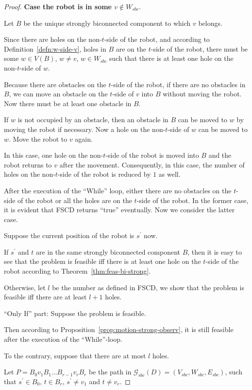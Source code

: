 \documentclass{article}
\begin{document}
\begin{proof}
\textbf{Case the robot is in some $v \not \in W_{sbc}$}.

Let $B$ be the unique strongly biconnected component to which $v$
belongs.

Since there are holes on the non-$t$-side of the robot, and
according to Definition~\ref{defn:w-side-v}, holes in $B$ are on the
$t$-side of the robot, there must be some $w \in V(B)$, $w \ne v$,
$w \in W_{sbc}$ such that there is at least one hole on the
non-$t$-side of $w$.

Because there are obstacles on the $t$-side of the robot, if there
are no obstacles in $B$, we can move an obstacle on the $t$-side of
$v$ into $B$ without moving the robot. Now there must be at least
one obstacle in $B$.

If $w$ is not occupied by an obstacle, then an obstacle in $B$ can
be moved to $w$ by moving the robot if necessary. Now a hole on the
non-$t$-side of $w$ can be moved to $w$. Move the robot to $v$
again.

In this case, one hole on the non-$t$-side of the robot is moved
into $B$ and the robot returns to $v$ after the movement.
Consequently, in this case, the number of holes on the non-$t$-side
of the robot is reduced by $1$ as well.

\medskip

\noindent After the execution of the ``While'' loop, either there
are no obstacles on the $t$-side of the robot or all the holes are
on the $t$-side of the robot. In the former case, it is evident that
FSCD returns ``true'' eventually. Now we consider the latter case.

Suppose the current position of the robot is $s^\prime$ now.

If $s^\prime$ and $t$ are in the same strongly biconnected component
$B$, then it is easy to see that the problem is feasible iff there
is at least one hole on the $t$-side of the robot according to
Theorem~\ref{thm:feas-bi-strong}.

Otherwise, let $l$ be the number as defined in FSCD, we show that
the problem is feasible iff there are at least $l+1$ holes.

``Only If'' part: Suppose the problem is feasible.

Then according to Proposition~\ref{prop:motion-strong-observ}, it is
still feasible after the execution of the ``While''-loop.

To the contrary, suppose that there are at most $l$ holes.

Let $P=B_0v_1B_1...B_{r-1}v_rB_r$ be the path in
$\mathcal{G}_{sbc}(D)=(V_{sbc},W_{sbc},E_{sbc})$, such that
$s^\prime \in B_0$, $t \in B_r$, $s^\prime \neq v_1$ and $t \neq
v_r$.


\end{proof}
\end{document}
